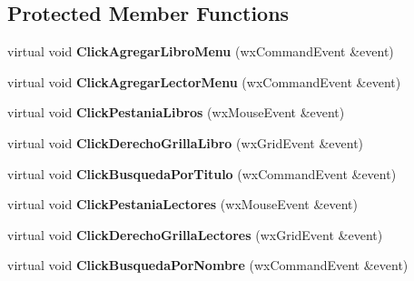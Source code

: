 \subsection*{Protected Member Functions}
\begin{DoxyCompactItemize}
\item 
virtual void {\bfseries Click\+Agregar\+Libro\+Menu} (wx\+Command\+Event \&event)\hypertarget{class_ventana_principal_a8516dfa50e0a94078dc1d08fecbaab99}{}\label{class_ventana_principal_a8516dfa50e0a94078dc1d08fecbaab99}

\item 
virtual void {\bfseries Click\+Agregar\+Lector\+Menu} (wx\+Command\+Event \&event)\hypertarget{class_ventana_principal_a562996206a804852b54b3a4bcdc99755}{}\label{class_ventana_principal_a562996206a804852b54b3a4bcdc99755}

\item 
virtual void {\bfseries Click\+Pestania\+Libros} (wx\+Mouse\+Event \&event)\hypertarget{class_ventana_principal_ada4bd8adede2869bfc8c13a2f0e8afa3}{}\label{class_ventana_principal_ada4bd8adede2869bfc8c13a2f0e8afa3}

\item 
virtual void {\bfseries Click\+Derecho\+Grilla\+Libro} (wx\+Grid\+Event \&event)\hypertarget{class_ventana_principal_aca11c056b12f20b0908f9274523fd036}{}\label{class_ventana_principal_aca11c056b12f20b0908f9274523fd036}

\item 
virtual void {\bfseries Click\+Busqueda\+Por\+Titulo} (wx\+Command\+Event \&event)\hypertarget{class_ventana_principal_a96b52de26d860861d06aa264c95de97d}{}\label{class_ventana_principal_a96b52de26d860861d06aa264c95de97d}

\item 
virtual void {\bfseries Click\+Pestania\+Lectores} (wx\+Mouse\+Event \&event)\hypertarget{class_ventana_principal_aaad9dd7b93f35d7aef9a5db4e8dc0c3e}{}\label{class_ventana_principal_aaad9dd7b93f35d7aef9a5db4e8dc0c3e}

\item 
virtual void {\bfseries Click\+Derecho\+Grilla\+Lectores} (wx\+Grid\+Event \&event)\hypertarget{class_ventana_principal_a45ff4b8276750dd6277f556e0241ad19}{}\label{class_ventana_principal_a45ff4b8276750dd6277f556e0241ad19}

\item 
virtual void {\bfseries Click\+Busqueda\+Por\+Nombre} (wx\+Command\+Event \&event)\hypertarget{class_ventana_principal_a947b45816c4647162a4b6cad3b0d53d9}{}\label{class_ventana_principal_a947b45816c4647162a4b6cad3b0d53d9}


\end{DoxyCompactItemize}
